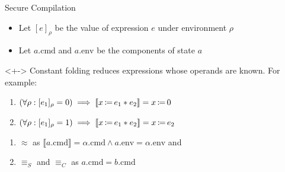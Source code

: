 \begin{frame}{Secure Compilation}
\begin{itemize}
    \item<+-> Let $[e]_{\rho}$ be the value of expression $e$
    under environment $\rho$
    \item<+-> Let $a.\mathrm{cmd}$ and $a.\mathrm{env}$ be the
    components of state $a$
\end{itemize}

\begin{example}<+->
    Constant folding reduces expressions whose operands are known. For example:
    \begin{enumerate}
        \item<only@+-> $
            \left(\forall \rho : [e_1]_{\rho} = 0\right)
            \implies
            \llbracket x \operatorname{\coloneqq} e_1 * e_2\rrbracket = x \operatorname{\coloneqq} 0
        $
        
        \item<only@+-> $
            \left(\forall \rho : [e_1]_{\rho} = 1\right)
            \implies
            \llbracket x \operatorname{\coloneqq} e_1 * e_2\rrbracket = x \operatorname{\coloneqq} e_2
        $
    \end{enumerate}
    
    \begin{enumerate}
        \item<only@+-> $\approx$ as
        $
            \llbracket a.\mathrm{cmd}\rrbracket = \alpha.\mathrm{cmd}
            \land
            a.\mathrm{env} = \alpha.\mathrm{env}
        $ and
        
        \item<only@+-> $\equiv_S$ and $\equiv_C$ as
        $
            a.\mathrm{cmd} = b.\mathrm{cmd}
        $
    \end{enumerate}
\end{example}
\end{frame}

